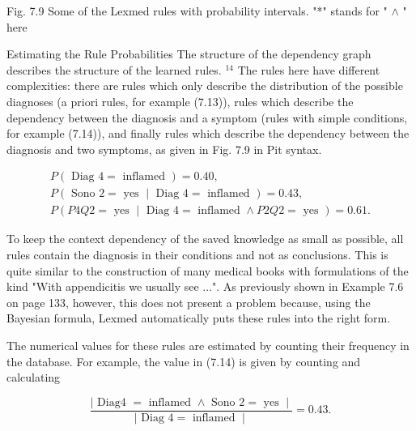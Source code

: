 \documentclass[10pt]{book}
\begin{document}
\begin{center}
\begin{enumerate}
Fig. 7.9 Some of the Lexmed rules with probability intervals. "*" stands for " $\wedge$ " here

Estimating the Rule Probabilities The structure of the dependency graph describes the structure of the learned rules. ${ }^{14}$ The rules here have different complexities: there are rules which only describe the distribution of the possible diagnoses (a priori rules, for example (7.13)), rules which describe the dependency between the diagnosis and a symptom (rules with simple conditions, for example (7.14)), and finally rules which describe the dependency between the diagnosis and two symptoms, as given in Fig. 7.9 in Pit syntax.

\[
\begin{array}{r}
P(\text { Diag } 4=\text { inflamed })=0.40, \\
P(\text { Sono } 2=\text { yes } \mid \text { Diag } 4=\text { inflamed })=0.43, \\
P(P 4 Q 2=\text { yes } \mid \text { Diag } 4=\text { inflamed } \wedge P 2 Q 2=\text { yes })=0.61 . \tag{7.15}
\end{array}
\]

To keep the context dependency of the saved knowledge as small as possible, all rules contain the diagnosis in their conditions and not as conclusions. This is quite similar to the construction of many medical books with formulations of the kind "With appendicitis we usually see ...". As previously shown in Example 7.6 on page 133, however, this does not present a problem because, using the Bayesian formula, Lexmed automatically puts these rules into the right form.

The numerical values for these rules are estimated by counting their frequency in the database. For example, the value in (7.14) is given by counting and calculating

$$
\frac{\mid \text { Diag4 }=\text { inflamed } \wedge \text { Sono } 2=\text { yes } \mid}{\mid \text { Diag } 4=\text { inflamed } \mid}=0.43 .
$$


\end{enumerate}
\end{center}
\end{document}
